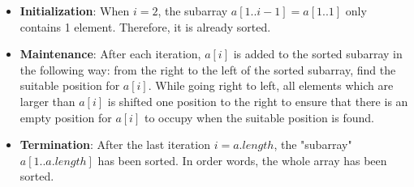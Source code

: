     \begin{itemize}
      \item \textbf{Initialization}: When $i = 2$, the subarray $a[1..i - 1] = a[1..1]$ only
        contains 1 element. Therefore, it is already sorted.
      \item \textbf{Maintenance}: After each iteration, $a[i]$ is added to the sorted
        subarray in the following way: from the right to the left of the sorted subarray,
        find the suitable position for $a[i]$. While going right to left, all elements
        which are larger than $a[i]$ is shifted one position to the right to ensure that
        there is an empty position for $a[i]$ to occupy when the suitable position is
        found.
      \item \textbf{Termination}: After the last iteration $i = a.length$, the "subarray"
        $a[1..a.length]$ has been sorted. In order words, the whole array has been sorted.
    \end{itemize}

